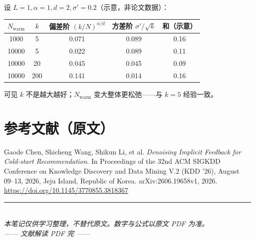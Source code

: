 \documentclass[11pt,a4paper]{ctexart}
\begin{document}
设 $L=1,\alpha=1,d=2,\sigma'=0.2$（示意，非论文数据）：
\begin{center}
\small
\begin{tabular}{ccccc}
\toprule
$N_{\mathrm{warm}}$ & $k$ & 偏差阶 $(k/N)^{\alpha/d}$ & 方差阶 $\sigma'/\sqrt{k}$ & 和（示意） \\
\midrule
1000 & 5 & 0.071 & 0.089 & 0.16 \\
10000 & 5 & 0.022 & 0.089 & 0.11 \\
10000 & 20 & 0.045 & 0.045 & 0.09 \\
10000 & 200 & 0.141 & 0.014 & 0.16 \\
\bottomrule
\end{tabular}
\end{center}
可见 $k$ 不是越大越好；$N_{\mathrm{warm}}$ 变大整体更松弛——与 $k=5$ 经验一致。

\section{参考文献（原文）}

\noindent
Gaode Chen, Shicheng Wang, Shikun Li, et al.
\textit{Denoising Implicit Feedback for Cold-start Recommendation}.
In Proceedings of the 32nd ACM SIGKDD Conference on Knowledge Discovery and Data Mining V.2 (KDD '26),
August 09--13, 2026, Jeju Island, Republic of Korea.
arXiv:2606.19658v1, 2026.
\url{https://doi.org/10.1145/3770855.3818367}

\vspace{1.2em}
\begin{center}
\rule{0.4\textwidth}{0.4pt}\\[0.6em]
\textit{本笔记仅供学习整理，不替代原文。数字与公式以原文 PDF 为准。}\\[0.3em]
\textit{—— 文献解读 PDF 完 ——}
\end{center}
\end{document}
